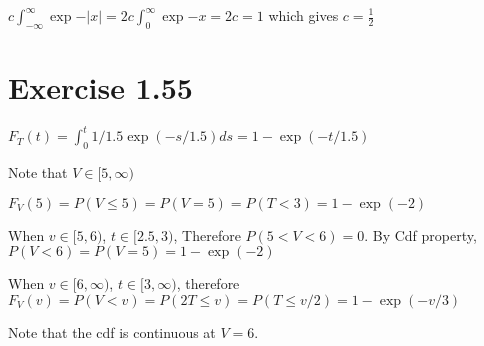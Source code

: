 \documentclass[12pt]{article}
\begin{document}
$c \int_{-\infty}^{\infty} \exp{-|x|} = 2c \int_{0}^{\infty}\exp{-x} = 2c  = 1$ which gives $c = \frac{1}{2}$

\section*{Exercise 1.55}
$F_T(t) = \int_{0}^{t} 1/1.5 \exp(-s/1.5)ds = 1 - \exp(-t/1.5)$

Note that $V\in [5, \infty)$

$F_V(5) = P(V \leq 5)= P(V = 5) = P(T < 3) = 1 -\exp(-2)$

When $v \in [5, 6)$,  $t \in [2.5, 3)$, Therefore $P(5 < V < 6) = 0$. By Cdf property, $P(V < 6) = P(V=5) = 1 -\exp(-2)$

When $v \in [6, \infty)$, $t \in [3, \infty)$, therefore $F_V(v) = P(V < v) =  P(2T \leq v) = P(T \leq v/2) = 1 -\exp(-v/3)$

Note that the cdf is continuous at $V=6$.
\end{document}
